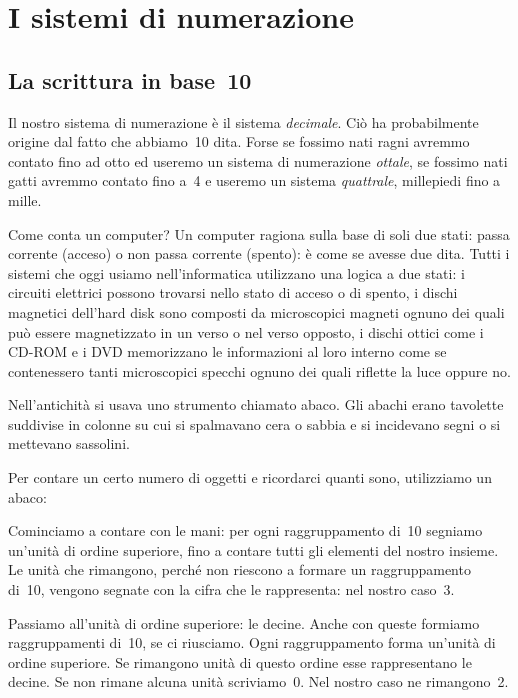 \chapter{I sistemi di numerazione}
\section{La scrittura in base~10}
Il nostro sistema di numerazione è il sistema \emph{decimale}. Ciò ha
probabilmente origine dal fatto che abbiamo~10 dita. Forse se fossimo
nati ragni avremmo contato fino ad otto ed useremo un sistema di
numerazione \emph{ottale}, se fossimo nati gatti avremmo contato fino a~4 e
useremo un sistema \emph{quattrale}, millepiedi fino a mille.

Come conta un
computer? Un computer ragiona sulla base di soli due stati: passa corrente (acceso) o non
passa corrente (spento): è come se avesse due dita. Tutti i sistemi che oggi
usiamo nell'informatica utilizzano una logica a due stati: i circuiti elettrici possono trovarsi nello stato di acceso o di spento, i dischi magnetici
dell'hard disk sono composti da microscopici magneti ognuno dei quali può essere magnetizzato in un verso o nel verso opposto, i dischi
ottici come i CD-ROM
e i DVD memorizzano le informazioni al loro interno come se contenessero tanti microscopici specchi ognuno dei quali riflette la luce oppure no.

Nell'antichità si usava uno strumento chiamato abaco. Gli abachi erano tavolette suddivise in colonne su cui si spalmavano
cera o sabbia e si incidevano segni o si mettevano sassolini.

Per contare un certo numero di oggetti e ricordarci quanti sono, utilizziamo un abaco:
\begin{center}

\end{center}

Cominciamo a contare con le mani: per ogni raggruppamento di~10 segniamo un'unità di ordine superiore, fino a contare tutti
gli elementi del nostro insieme. Le unità che rimangono, perché non riescono a formare un raggruppamento di~10, vengono
segnate con la cifra che le rappresenta: nel nostro caso~3.

Passiamo all'unità di ordine superiore: le decine. Anche con queste formiamo raggruppamenti di~10, se ci riusciamo. Ogni
raggruppamento forma un'unità di ordine superiore. Se rimangono unità di questo ordine esse rappresentano le decine. Se non
rimane alcuna unità scriviamo~0. Nel nostro caso ne rimangono~2.

